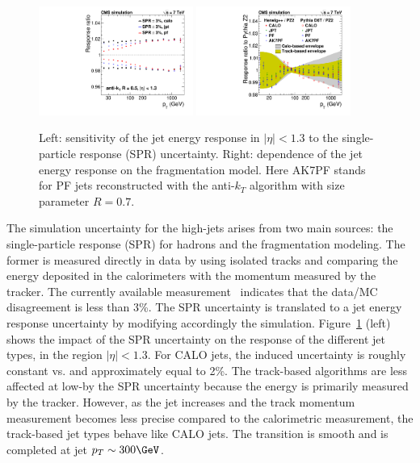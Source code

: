 \begin{figure}[ht!]
  \begin{center}
    \includegraphics[width=0.45\textwidth]{Figures/JEC/singlepionresponse} 
    \includegraphics[width=0.45\textwidth]{Figures/JEC/highpt_envelope}
    \caption{Left: sensitivity of the jet energy response in $|\eta|<1.3$ to the single-particle response (SPR) uncertainty. Right: dependence of the jet energy response on the fragmentation model. Here AK7PF stands for PF jets reconstructed with the anti-$k_T$ algorithm with size parameter $R=0.7$.}
    \label{fig:FragSpr}
  \end{center}
\end{figure}

The simulation uncertainty for the high-\pt jets arises from two main sources: the single-particle response (SPR) for hadrons and the fragmentation modeling. The former is measured directly in data by using isolated tracks and comparing the energy deposited in the calorimeters with the momentum measured by the tracker. The currently available measurement~\cite{JME-10-008} indicates that the data/MC disagreement is less than 3\%. The SPR uncertainty is translated to a jet energy response uncertainty by modifying accordingly the simulation. Figure~\ref{fig:FragSpr} (left) shows the impact of the SPR uncertainty on the response of the different jet types, in the region $|\eta|<1.3$. For CALO jets, the induced uncertainty is roughly constant vs. \pt and approximately equal to 2\%. The track-based algorithms are less affected at low-\pt by the SPR uncertainty because the energy is primarily measured by the tracker. However, as the jet \pt increases and the track momentum measurement becomes less precise compared to the calorimetric measurement, the track-based jet types behave like CALO jets. The transition is smooth and is completed at jet $\pt\sim 300\GeV$. 

